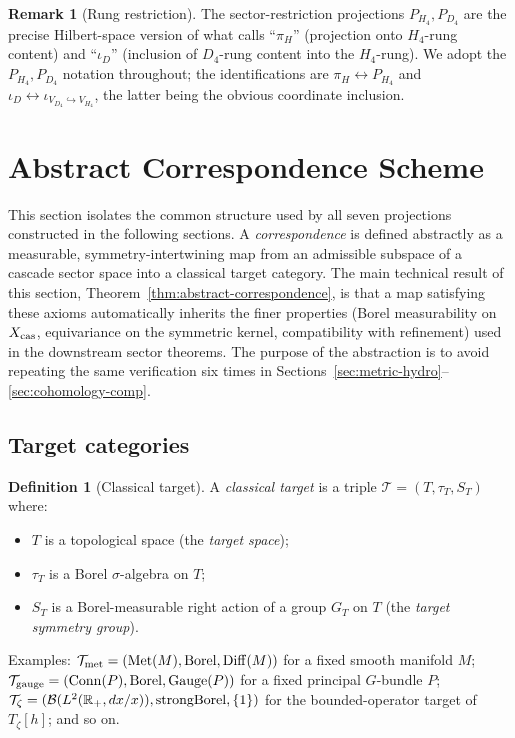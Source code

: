 \documentclass[11pt, a4paper]{amsart}
\theoremstyle{definition}
\newtheorem{definition}[theorem]{Definition}
\newtheorem{remark}[theorem]{Remark}
\newcommand{\R}{\mathbb{R}}
\newcommand{\cas}{{\rm cas}}
\newcommand{\met}{{\rm met}}
\newcommand{\gge}{{\rm gauge}}
\newcommand{\Met}{\operatorname{Met}}
\newcommand{\Conn}{\operatorname{Conn}}
\begin{document}
\begin{remark}[Rung restriction]
The sector-restriction projections $P_{H_4}, P_{D_4}$ are the
precise Hilbert-space version of what
\cite[\S\S 2--3]{CascadeEmbeddings} calls ``$\pi_H$'' (projection
onto $H_4$-rung content) and ``$\iota_D$'' (inclusion of
$D_4$-rung content into the $H_4$-rung). We adopt the
$P_{H_4}, P_{D_4}$ notation throughout; the identifications are
$\pi_H \leftrightarrow P_{H_4}$ and $\iota_D \leftrightarrow
\iota_{V_{D_4} \hookrightarrow V_{H_4}}$, the latter being the
obvious coordinate inclusion.
\end{remark}

\section{Abstract Correspondence Scheme}
\label{sec:corresp}

This section isolates the common structure used by all seven
projections constructed in the following sections. A
\emph{correspondence} is defined abstractly as a measurable,
symmetry-intertwining map from an admissible subspace of a
cascade sector space into a classical target category. The main
technical result of this section,
Theorem~\ref{thm:abstract-correspondence}, is that a map
satisfying these axioms automatically inherits the finer
properties (Borel measurability on $X_\cas$, equivariance on the
symmetric kernel, compatibility with refinement) used in the
downstream sector theorems. The purpose of the abstraction is to
avoid repeating the same verification six times in
Sections~\ref{sec:metric-hydro}--\ref{sec:cohomology-comp}.

\subsection{Target categories}
\label{subsec:target-cats}

\begin{definition}[Classical target]
\label{def:target}
A \emph{classical target} is a triple
$\mathcal{T} = (T, \tau_T, S_T)$ where:
\begin{itemize}
\item $T$ is a topological space (the \emph{target space});
\item $\tau_T$ is a Borel $\sigma$-algebra on $T$;
\item $S_T$ is a Borel-measurable right action of a group $G_T$
  on $T$ (the \emph{target symmetry group}).
\end{itemize}
Examples: $\mathcal{T}_{\met} = (\Met(M), {\rm Borel}, {\rm
Diff}(M))$ for a fixed smooth manifold $M$; $\mathcal{T}_{\gge} =
(\Conn(P), {\rm Borel}, {\rm Gauge}(P))$ for a fixed principal
$G$-bundle $P$; $\mathcal{T}_\zeta = (\mathcal{B}(L^2(\R_+, dx/x)),
{\rm strong Borel}, \{1\})$ for the bounded-operator target of
$T_\zeta[h]$; and so on.
\end{definition}
\end{document}

